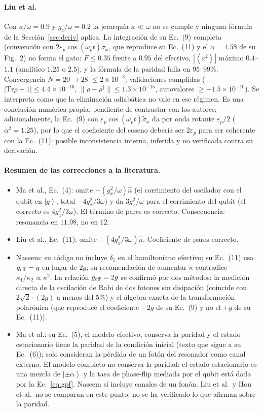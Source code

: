 \documentclass[11pt,a4paper]{article}
\newcommand{\ket}[1]{\left|#1\right\rangle}
\newcommand{\ave}[1]{\left\langle#1\right\rangle}
\newcommand{\hn}{\hat n}
\theoremstyle{definition}
\begin{document}
\paragraph{Liu et al.} Con $\kappa/\omega=0.9$ y $g_z/\omega=0.2$ la jerarquía $\kappa\ll\omega$ no se cumple y ninguna fórmula de la Sección~\ref{sec:deriv} aplica. La integración de su Ec.~(9) completa (convención con $2\varepsilon_p\cos(\omega_pt)\tilde\sigma_x$, que reproduce su Ec.~(11) y el $\alpha=1.58$ de su Fig.~2) no forma el gato: $F\leq0.35$ frente a $0.95$ del efectivo, $|\ave{a^2}|$ máximo $0.4$--$1.1$ (analítico $1.25$ o $2.5$), y la fórmula de la paridad falla en $95$--$99\%$. Convergencia $N=20\to28$ $\leq2\times10^{-3}$; validaciones cumplidas ($|\mathrm{Tr}\rho-1|\leq4.4\times10^{-16}$, $\|\rho-\rho^{\dagger}\|\leq1.3\times10^{-15}$, autovalores $\geq-1.5\times10^{-10}$). Se interpreta como que la eliminación adiabática no vale en ese régimen. Es una conclusión numérica propia, pendiente de contrastar con los autores; adicionalmente, la Ec.~(9) con $\varepsilon_p\cos(\omega_pt)\tilde\sigma_x$ da por onda rotante $\varepsilon_p/2$ ($\alpha^2=1.25$), por lo que el coeficiente del coseno debería ser $2\varepsilon_p$ para ser coherente con la Ec.~(11): posible inconsistencia interna, inferida y no verificada contra su derivación.

\paragraph{Resumen de las correcciones a la literatura.}
\begin{itemize}
\item Ma et al., Ec.~(4): omite $-(g_x^2/\omega)\hn$ (el corrimiento del oscilador con el qubit en $\ket{g}$, total $-4g_x^2/3\omega$) y da $3g_x^2/\omega$ para el corrimiento del qubit (el correcto es $4g_x^2/3\omega$). El término de pares es correcto. Consecuencia: resonancia en $11.98$, no en $12$.
\item Liu et al., Ec.~(11): omite $-(4g_x^2/3\omega)\hn$. Coeficiente de pares correcto.
\item Naseem: su código no incluye $\delta_1$ en el hamiltoniano efectivo; su Ec.~(11) usa $g_{\rm eff}=g$ en lugar de $2g$; su recomendación de aumentar $\kappa$ contradice $\kappa_1/\kappa_2\propto\kappa^2$. La relación $g_{\rm eff}=2g$ se confirmó por dos métodos: la medición directa de la oscilación de Rabi de dos fotones sin disipación (coincide con $2\sqrt2\cdot(2g)$ a menos del $5\%$) y el álgebra exacta de la transformación polarónica (que reproduce el coeficiente $-2g$ de su Ec.~(9) y no el $+g$ de su Ec.~(11)).
\item Ma et al.: su Ec.~(5), el modelo efectivo, conserva la paridad y el estado estacionario tiene la paridad de la condición inicial (texto que sigue a su Ec.~(6)); solo consideran la pérdida de un fotón del resonador como canal externo. El modelo completo no conserva la paridad: el estado estacionario es una mezcla de $\ket{\pm\alpha}$ y la tasa de phase-flip mediada por el qubit está dada por la Ec.~\eqref{eq:gpf}. Naseem sí incluye canales de un fonón. Liu et al.\ y Hou et al.\ no se comparan en este punto: no se ha verificado lo que afirman sobre la paridad.
\end{itemize}
\end{document}
